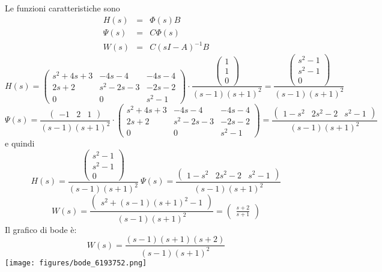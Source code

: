 \documentclass{article}
\begin{document}
Le funzioni caratteristiche sono \[\begin{array}{rcl}  H(s) & = & \Phi(s)B \\ \Psi(s) & = & C \Phi(s)\\ W(s) & = & C(sI-A)^{-1}B  \end{array} \]
\[ H(s) = \left(\begin{matrix}s^{2} + 4 s + 3 & - 4 s - 4 & - 4 s - 4\\2 s + 2 & s^{2} - 2 s - 3 & - 2 s - 2\\0 & 0 & s^{2} - 1\end{matrix}\right)\cdot \frac{\left(\begin{matrix}1\\1\\0\end{matrix}\right)}{\left(s - 1\right) \left(s + 1\right)^{2}} = \frac{\left(\begin{matrix}s^{2} - 1\\s^{2} - 1\\0\end{matrix}\right)}{\left(s - 1\right) \left(s + 1\right)^{2}} \]\[ \Psi(s) = \frac{\left(\begin{matrix}-1 & 2 & 1\end{matrix}\right)}{\left(s - 1\right) \left(s + 1\right)^{2}}\cdot\left(\begin{matrix}s^{2} + 4 s + 3 & - 4 s - 4 & - 4 s - 4\\2 s + 2 & s^{2} - 2 s - 3 & - 2 s - 2\\0 & 0 & s^{2} - 1\end{matrix}\right)  = \frac{\left(\begin{matrix}1 - s^{2} & 2 s^{2} - 2 & s^{2} - 1\end{matrix}\right)}{\left(s - 1\right) \left(s + 1\right)^{2}} \]
e quindi \[ H(s)  =  \frac{\left(\begin{matrix}s^{2} - 1\\s^{2} - 1\\0\end{matrix}\right)}{\left(s - 1\right) \left(s + 1\right)^{2}} \ \Psi(s) = \frac{\left(\begin{matrix}1 - s^{2} & 2 s^{2} - 2 & s^{2} - 1\end{matrix}\right)}{\left(s - 1\right) \left(s + 1\right)^{2}} \]
\[ W(s)  =  \frac{\left(\begin{matrix}s^{2} + \left(s - 1\right) \left(s + 1\right)^{2} - 1\end{matrix}\right)}{\left(s - 1\right) \left(s + 1\right)^{2}} = \left(\begin{matrix}\frac{s + 2}{s + 1}\end{matrix}\right)  \] 
Il grafico di bode è:
\[ W(s) = \frac{\left(s - 1\right) \left(s + 1\right) \left(s + 2\right)}{\left(s - 1\right) \left(s + 1\right)^{2}} \]\texttt{[image: figures/bode\_6193752.png]}
\end{document}
